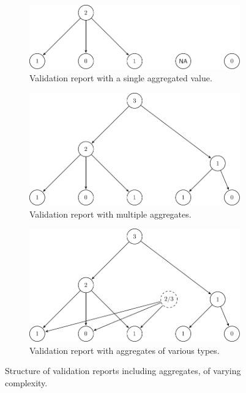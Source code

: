 \documentclass[a4paper, 11pt]{article}
\begin{document}
\begin{figure}[t]
  \centering
  \begin{subfigure}[b]{0.7\textwidth}
    \includegraphics[width=\textwidth]{fig/graph1.pdf}
    \caption{Validation report with a single aggregated value.}
    \label{fig:graph1}
  \end{subfigure}
  \begin{subfigure}[b]{0.7\textwidth}
    \includegraphics[width=\textwidth]{fig/graph2.pdf}
    \caption{Validation report with multiple aggregates.}
    \label{fig:graph2}
  \end{subfigure}
  \begin{subfigure}[b]{0.7\textwidth}
    \includegraphics[width=\textwidth]{fig/graph3.pdf}
    \caption{Validation report with aggregates of various types.}
    \label{fig:graph3}
  \end{subfigure}
  \caption{Structure of validation reports including aggregates, of varying complexity.}
  \label{fig:graphs}
\end{figure}
\end{document}
